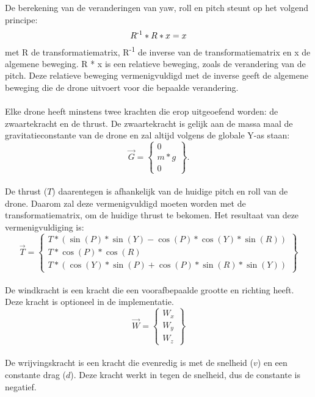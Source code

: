 De berekening van de veranderingen van yaw, roll en pitch steunt op het volgend principe: 
\begin{equation*}
R\textsuperscript{-1} * R * x = x
\end{equation*} 
met R de transformatiematrix, R\textsuperscript{-1} de inverse van de transformatiematrix en x de algemene beweging. R * x is een relatieve beweging, zoals de verandering van de pitch. Deze relatieve beweging vermenigvuldigd met de inverse geeft de algemene beweging die de drone uitvoert voor die bepaalde verandering.
\\
\\
Elke drone heeft minstens twee krachten die erop uitgeoefend worden: de zwaartekracht en de thrust. De zwaartekracht is gelijk aan de massa maal de gravitatieconstante van de drone en zal altijd volgens de globale Y-as staan: \\
\begin{equation*} 
\vec{G} =
\begin{Bmatrix}
0 \\
m * g \\
0 
\end{Bmatrix}.
\end{equation*} 
\\
De thrust (\(T\)) daarentegen is afhankelijk van de huidige pitch en roll van de drone. Daarom zal deze vermenigvuldigd moeten worden met de transformatiematrix, om de huidige thrust te bekomen. Het resultaat van deze vermenigvuldiging is: 
\begin{equation*} 
\vec{T} = 
\begin{Bmatrix}
T*(\sin(P)*\sin(Y) - \cos(P)*\cos(Y)*\sin(R))\\ 
T*\cos(P)*\cos(R) \\
T*(\cos(Y)*\sin(P) + \cos(P)*\sin(R)*\sin(Y))
\end{Bmatrix}
\end{equation*}
\\
De windkracht is een kracht die een voorafbepaalde grootte en richting heeft. Deze kracht is optioneel in de implementatie. \\
\begin{equation*}
\vec{W} = 
\begin{Bmatrix}
W_x \\
W_y \\
W_z 
\end{Bmatrix}
\end{equation*}
\\
De wrijvingskracht is een kracht die evenredig is met de snelheid (\(v\)) en een constante drag (\(d\)). Deze kracht werkt in tegen de snelheid, dus de constante is negatief. \\
